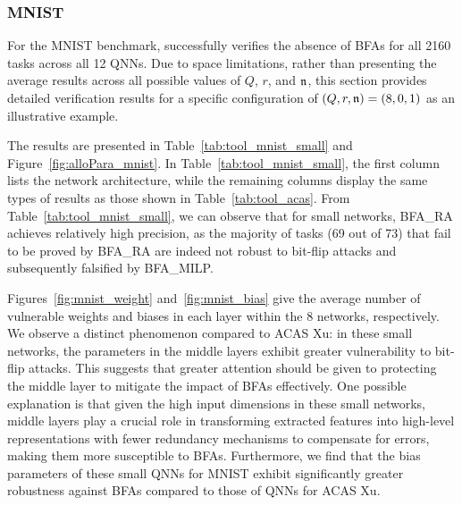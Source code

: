 \subsubsection{MNIST}
For the MNIST benchmark, \tool successfully verifies the absence of BFAs for all 2160 tasks across all 12 QNNs. Due to space limitations,  
rather than presenting the average results across all possible values of $Q$, $r$, and $\mathfrak{n}$, this section provides detailed verification results for a specific configuration of $(Q,r,\mathfrak{n})=(8,0,1)$ as an illustrative example. 

The results are presented in Table~\ref{tab:tool_mnist_small} and Figure~\ref{fig:alloPara_mnist}. 
In Table~\ref{tab:tool_mnist_small}, the first column lists the network architecture, while the remaining columns display the same types of results as those shown in Table~\ref{tab:tool_acas}. From Table~\ref{tab:tool_mnist_small}, we can observe that for small networks, {\sf BFA\_RA} achieves relatively high precision, as the majority of tasks (69 out of 73) that fail to be proved by {\sf BFA\_RA} are indeed not robust to bit-flip attacks and subsequently falsified by {\sf BFA\_MILP}.

Figures~\ref{fig:mnist_weight} and~\ref{fig:mnist_bias} give the average number of vulnerable weights and biases in each layer within the 8 networks, respectively. We observe a distinct phenomenon compared to ACAS Xu: in these small networks, the parameters in the middle layers exhibit greater vulnerability to bit-flip attacks. This suggests that greater attention should be given to protecting the middle layer to mitigate the impact of BFAs effectively.
% 
One possible explanation is that given the high input dimensions in these small networks, middle layers play a crucial role in transforming extracted features into high-level representations with fewer redundancy mechanisms to compensate for errors, making them more susceptible to BFAs. 
Furthermore, we find that the bias parameters of these small QNNs for MNIST exhibit significantly greater robustness against BFAs compared to those of QNNs for ACAS Xu.





\vspace{2mm}
\noindent
\setlength{\fboxsep}{3pt}%
\setlength{\fboxrule}{1pt}%
\vspace{2mm}

